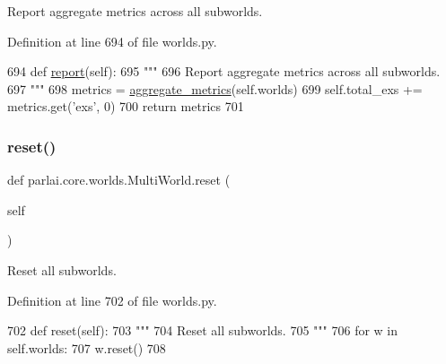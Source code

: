 \begin{DoxyVerb}Report aggregate metrics across all subworlds.
\end{DoxyVerb}
 

Definition at line 694 of file worlds.\+py.


\begin{DoxyCode}
694     \textcolor{keyword}{def }\hyperlink{namespaceprojects_1_1convai2_1_1eval__f1_a01a47b9c08dad189837a51f085defc45}{report}(self):
695         \textcolor{stringliteral}{"""}
696 \textcolor{stringliteral}{        Report aggregate metrics across all subworlds.}
697 \textcolor{stringliteral}{        """}
698         metrics = \hyperlink{namespaceparlai_1_1core_1_1metrics_aa4ed5491962e06684b235fffe1b20fec}{aggregate\_metrics}(self.worlds)
699         self.total\_exs += metrics.get(\textcolor{stringliteral}{'exs'}, 0)
700         \textcolor{keywordflow}{return} metrics
701 
\end{DoxyCode}
\mbox{\label{classparlai_1_1core_1_1worlds_1_1MultiWorld_afcdadb92455ce41a8156390d876ebb96}} 
\subsubsection{\texorpdfstring{reset()}{reset()}}
{\footnotesize\ttfamily def parlai.\+core.\+worlds.\+Multi\+World.\+reset (\begin{DoxyParamCaption}\item[{}]{self }\end{DoxyParamCaption})}

\begin{DoxyVerb}Reset all subworlds.
\end{DoxyVerb}
 

Definition at line 702 of file worlds.\+py.


\begin{DoxyCode}
702     \textcolor{keyword}{def }reset(self):
703         \textcolor{stringliteral}{"""}
704 \textcolor{stringliteral}{        Reset all subworlds.}
705 \textcolor{stringliteral}{        """}
706         \textcolor{keywordflow}{for} w \textcolor{keywordflow}{in} self.worlds:
707             w.reset()
708 
\end{DoxyCode}
\mbox{\label{classparlai_1_1core_1_1worlds_1_1MultiWorld_a7d52dd60bfa5654bfc4ad656ccb07fa1}} 
